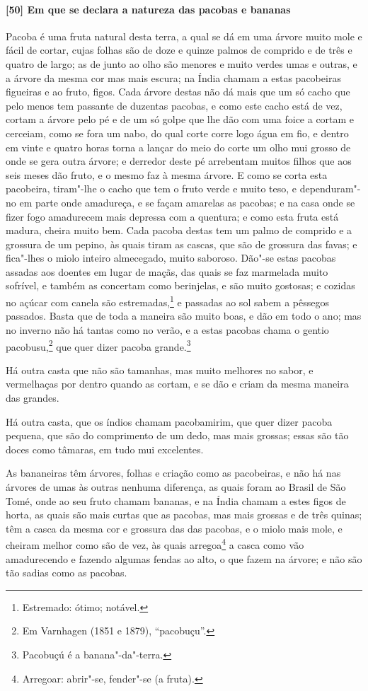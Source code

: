 \begin{linenumbers}
\paragraph{[50] Em que se declara a natureza das pacobas e bananas}\quad
\mbox{Pacoba} é uma fruta natural desta terra, a qual se dá em uma árvore muito mole e fácil de
cortar, cujas folhas são de doze e quinze palmos de comprido e de três e quatro de largo;
as de junto ao olho são menores e muito verdes umas e outras, e a árvore da mesma cor mas
mais escura; na Índia chamam a estas pacobeiras figueiras e ao fruto, figos. Cada árvore
destas não dá mais que um só cacho que pelo menos tem passante de duzentas pacobas, e como
este cacho está de vez, cortam a árvore pelo pé e de um só golpe que lhe dão com uma foice
a cortam e cerceiam, como se fora um nabo, do qual corte corre logo água em fio, e dentro
em vinte e quatro horas torna a lançar do meio do corte um olho mui grosso de onde se gera
outra árvore; e derredor deste pé arrebentam muitos filhos que aos seis meses dão fruto, e
o mesmo faz à mesma árvore. E como se corta esta pacobeira, tiram"-lhe o cacho que tem o
fruto verde e muito teso, e dependuram"-no em parte onde amadureça, e se façam amarelas as
pacobas; e na casa onde se fizer fogo amadurecem mais depressa com a quentura; e como esta
fruta está madura, cheira muito bem. Cada pacoba destas tem um palmo de comprido e a
grossura de um pepino, às quais tiram as cascas, que são de grossura das favas; e
fica"-lhes o miolo inteiro almecegado, muito saboroso. Dão"-se estas pacobas assadas aos
doentes em lugar de maçãs, das quais se faz marmelada muito sofrível, e também as
concertam como berinjelas, e são muito gostosas; e cozidas no açúcar com canela são
estremadas,\footnote{ Estremado: ótimo; notável.} e passadas ao sol sabem a pêssegos
passados. Basta que de toda a maneira são muito boas, e dão em todo o ano; mas no inverno
não há tantas como no verão, e a estas pacobas chama o gentio pacobusu,\footnote{ Em
Varnhagen (1851 e 1879), ``pacobuçu''.} que quer dizer pacoba grande.\footnote{ Pacobuçú é
a banana"-da"-terra.}

Há outra casta que não são tamanhas, mas muito melhores no sabor, e vermelhaças por dentro
quando as cortam, e se dão e criam da mesma maneira das grandes.

Há outra casta, que os índios chamam pacobamirim, que quer dizer pacoba pequena, que são
do comprimento de um dedo, mas mais grossas; essas são tão doces como tâmaras, em tudo mui
excelentes.

As bananeiras têm árvores, folhas e criação como as pacobeiras, e não há nas árvores de
umas às outras nenhuma diferença, as quais foram ao Brasil de São Tomé, onde ao seu fruto
chamam bananas, e na Índia chamam a estes figos de horta, as quais são mais curtas que as
pacobas, mas mais grossas e de três quinas; têm a casca da mesma cor e grossura das das
pacobas, e o miolo mais mole, e cheiram melhor como são de vez, às quais arregoa\footnote{
Arregoar: abrir"-se, fender"-se (a fruta).} a casca como vão amadurecendo e fazendo algumas
fendas ao alto, o que fazem na árvore; e não são tão sadias como as pacobas.


\end{linenumbers}
